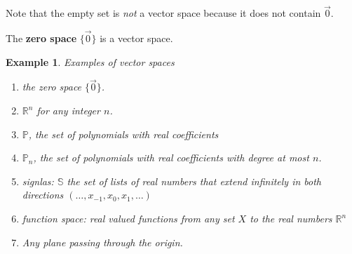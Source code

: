 \documentclass[11pt]{article}
\newtheorem{ex}{Example}
\begin{document}
Note that the empty set is \emph{not} a vector space because it does not contain $\vec{0}$.


The \textbf{zero space} $\{\vec{0}\}$ is a vector space.

\begin{ex}
  Examples of vector spaces
  \begin{enumerate}
    \item the zero space $\{\vec{0}\}$.
    \item $\mathbb{R}^{n}$ for any integer $n$.
    \item $\mathbb{P}$, the set of polynomials with real coefficients
    \item $\mathbb{P}_{n}$, the set of polynomials with real coefficients with degree at most $n$.
    \item signlas: $\mathbb{S}$ the set of lists of real numbers that extend infinitely in both directions $(\ldots, x_{-1}, x_{0}, x_{1}, \ldots)$
    \item function space: real valued functions from any set $X$ to the real numbers $\mathbb{R}^{n}$
    \item Any plane passing through the origin.
  \end{enumerate}
\end{ex}
\end{document}
